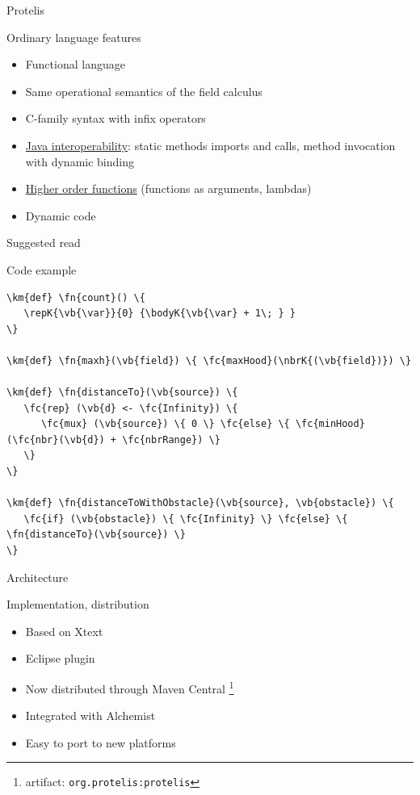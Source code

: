 \documentclass[presentation]{beamer} %
\newcommand{\km}[1]{\textcolor{purple}{#1}} %
\newcommand{\fc}[1]{\textcolor{Fuchsia}{#1}} %
\newcommand{\fn}[1]{\textcolor{blue}{#1}} %
\newcommand{\vb}[1]{\textcolor{OliveGreen}{#1}} %
\newcommand{\bral}{\textrm{{\tt {\char '173}}}\,}
\newcommand{\brar}{\textrm{{\tt {\char '175}}}}
\newcommand{\var}{\texttt{x}}
\newcommand{\bodyK}[1]{\bral\! #1\!\brar}
\newcommand{\repK}[3]{\texttt{\fc{rep}(#1<-#2)}#3}
\newcommand{\nbrK}[1]{\texttt{\fc{nbr}}#1}
\begin{document}
\begin{frame}{Protelis \cite{ProtelisSAC14}}
  \begin{block} {Ordinary language features}
   \begin{itemize}
    \item Functional language
    \item Same operational semantics of the field calculus 
    \item C-family syntax with infix operators
    \item \underline{Java interoperability}: static methods imports and calls, method invocation with dynamic binding
    \item \underline{Higher order functions} (functions as arguments, lambdas)
    \item Dynamic code
   \end{itemize}
  \end{block}
  \begin{block} {Suggested read \cite{IoT2015}}
  \end{block}
\end{frame}

\begin{frame}[fragile]{Code example}
\begin{Verbatim}[fontsize=\scriptsize, frame=single, commandchars=\\\{\}]
\km{def} \fn{count}() \{
   \repK{\vb{\var}}{0} {\bodyK{\vb{\var} + 1\; } }
\}

\km{def} \fn{maxh}(\vb{field}) \{ \fc{maxHood}(\nbrK{(\vb{field})}) \}

\km{def} \fn{distanceTo}(\vb{source}) \{
   \fc{rep} (\vb{d} <- \fc{Infinity}) \{
      \fc{mux} (\vb{source}) \{ 0 \} \fc{else} \{ \fc{minHood}(\fc{nbr}(\vb{d}) + \fc{nbrRange}) \}
   \}
\}

\km{def} \fn{distanceToWithObstacle}(\vb{source}, \vb{obstacle}) \{
   \fc{if} (\vb{obstacle}) \{ \fc{Infinity} \} \fc{else} \{ \fn{distanceTo}(\vb{source}) \}
\}
\end{Verbatim}
\end{frame}

\begin{frame}{Architecture}
  \begin{block} {Implementation, distribution}
   \begin{itemize}
    \item Based on Xtext
    \item Eclipse plugin
    \item Now distributed through Maven Central \footnote{artifact: \texttt{org.protelis:protelis}}
    \item Integrated with Alchemist \cite{alchemist-jos2013}
    \item Easy to port to new platforms
   \end{itemize}
  \end{block}
\end{frame}
\end{document}

